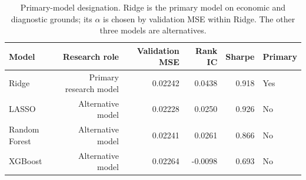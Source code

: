 \begin{table}[H]
\centering
\small
\begin{tabular}{lrrrrl}
\toprule
Model & Research role & Validation MSE & Rank IC & Sharpe & Primary \\
\midrule
Ridge & Primary research model & 0.02242 & 0.0438 & 0.918 & Yes \\
LASSO & Alternative model & 0.02228 & 0.0250 & 0.926 & No \\
Random Forest & Alternative model & 0.02241 & 0.0261 & 0.866 & No \\
XGBoost & Alternative model & 0.02264 & -0.0098 & 0.693 & No \\
\bottomrule
\end{tabular}
\caption{Primary-model designation. Ridge is the primary model on economic and diagnostic grounds; its $\alpha$ is chosen by validation MSE within Ridge. The other three models are alternatives.}
\label{tab:roles}
\end{table}
